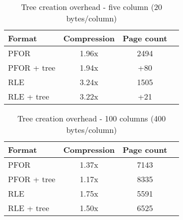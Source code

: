 \documentclass{vldb}
\begin{document}


\begin{table}
\caption{Tree creation overhead - five column (20 bytes/column)}
\centering
\label{table:treeCreation}
\begin{tabular}{|l|c|c|c|} \hline
Format     & Compression & Page count \\ \hline %
PFOR        & 1.96x       & 2494       \\ \hline %
PFOR + tree & 1.94x       & +80        \\ \hline %
RLE        & 3.24x       & 1505 \\ \hline %
RLE + tree & 3.22x       & +21        \\  %
\hline\end{tabular}
\end{table}
\begin{table}
\caption{Tree creation overhead - 100 columns (400 bytes/column)}
\centering
\label{table:treeCreationTwo}
\begin{tabular}{|l|c|c|c|} \hline
Format     & Compression & Page count \\ \hline %
PFOR        & 1.37x       & 7143       \\ \hline %
PFOR + tree & 1.17x       & 8335        \\ \hline %
RLE        & 1.75x       & 5591 \\ \hline %
RLE + tree & 1.50x       & 6525        \\  %

\hline\end{tabular}
\end{table}

\end{document}
